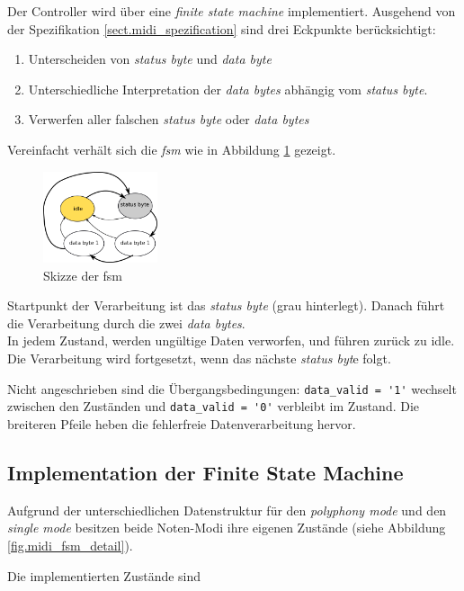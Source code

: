 Der Controller wird über eine \textit{finite state machine} implementiert. Ausgehend von der Spezifikation \ref{sect.midi_spezification} sind drei Eckpunkte berücksichtigt:
\begin{enumerate}
	\item Unterscheiden von \textit{status byte} und \textit{data byte}
	\item Unterschiedliche Interpretation der \textit{data bytes} abhängig vom \textit{status byte}.
	\item Verwerfen aller falschen \textit{status byte} oder \textit{data bytes}
\end{enumerate}
\smallskip
Vereinfacht verhält sich die \textit{fsm} wie in Abbildung \ref{fig.midi_fsm_skizze} gezeigt. 
\begin{figure}[H]
	\includegraphics[width=0.3\textwidth]{images/midi_control/fsm_grob_2.png}
	\caption{Skizze der fsm}
	\label{fig.midi_fsm_skizze}
\end{figure}

Startpunkt der Verarbeitung ist das \textit{status byte} (grau hinterlegt). Danach führt die Verarbeitung durch die zwei \textit{data bytes}.\\
In jedem Zustand, werden ungültige Daten verworfen, und führen zurück zu idle. Die Verarbeitung wird fortgesetzt, wenn das nächste \textit{status byt}e folgt.

Nicht angeschrieben sind die Übergangsbedingungen: \lstinline|data_valid = '1'| wechselt zwischen den Zuständen und \lstinline|data_valid = '0'| verbleibt im Zustand. Die breiteren Pfeile heben die fehlerfreie Datenverarbeitung hervor.

\subsection{Implementation der Finite State Machine}

Aufgrund der unterschiedlichen Datenstruktur für den \textit{polyphony mode} und den \textit{single mode} besitzen beide Noten-Modi ihre eigenen Zustände (siehe Abbildung \ref{fig.midi_fsm_detail}).

Die implementierten Zustände sind

